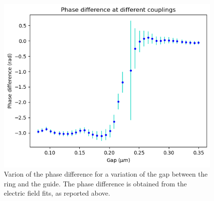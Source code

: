 \begin{figure}[H]
    \centering
    \includegraphics[width=0.7\linewidth]{Figures/ring_phase_vs_gap.png}
    \caption{Varion of the phase difference for a variation of the gap between the ring and the guide. The phase difference is obtained from the electric field fits, as reported above.}
    \label{fig:ring_phase_vs_gap}
\end{figure}